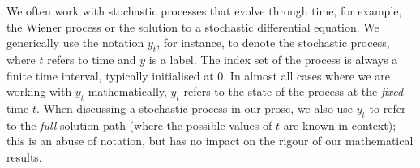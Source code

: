 We often work with stochastic processes that evolve through time, for example, the Wiener process or the solution to a stochastic differential equation.
We generically use the notation \(y_t\), for instance, to denote the stochastic process, where \(t\) refers to time and \(y\) is a label.
The index set of the process is always a finite time interval, typically initialised at \(0\).
In almost all cases where we are working with \(y_t\) mathematically, \(y_t\) refers to the state of the process at the \emph{fixed} time \(t\).
When discussing a stochastic process in our prose, we also use \(y_t\) to refer to the \emph{full} solution path (where the possible values of \(t\) are known in context); this is an abuse of notation, but has no impact on the rigour of our mathematical results.




